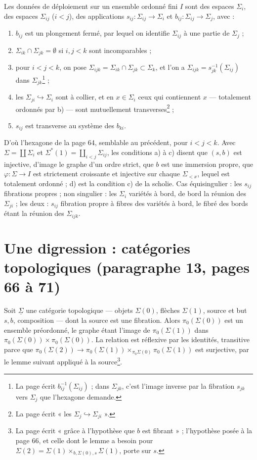 \documentclass[11pt,a4paper]{article}
\begin{document}
Les données de déploiement sur un ensemble ordonné fini $I$ sont des espaces
$\Sigma_i$, des espaces $\Sigma_{ij}$ ($i<j$), des applications $s_{ij} : \Sigma_{ij}
\to \Sigma_i$ et $b_{ij} : \Sigma_{ij} \to \Sigma_j$, avec :
\begin{enumerate}
\item[a)] $b_{ij}$ est un plongement fermé, par lequel on identifie $\Sigma_{ij}$ à
une partie de $\Sigma_j$ ;
\item[b)] $\Sigma_{ik} \cap \Sigma_{jk} = \emptyset$ si $i, j<k$ sont incomparables ;
\item[c)] pour $i<j<k$, on pose $\Sigma_{ijk} = \Sigma_{ik} \cap \Sigma_{jk} \subset
\Sigma_k$, et l'on a $\Sigma_{ijk} = s_{jk}^{-1}(\Sigma_{ij})$ dans
$\Sigma_{jk}$\footnote{La page écrit $b_{ij}^{-1}(\Sigma_{ij})$ ; dans $\Sigma_{jk}$,
c'est l'image inverse par la fibration $s_{jk}$ vers $\Sigma_j$ que l'hexagone
demande.} ;
\item[d)] les $\Sigma_{ji} \hookrightarrow \Sigma_i$ sont à collier, et en $x \in
\Sigma_i$ ceux qui contiennent $x$ — totalement ordonnés par b) — sont mutuellement
transverses\footnote{La page écrit « les $\Sigma_j \hookrightarrow \Sigma_{ji}$ ».} ;
\item[e)] $s_{ij}$ est transverse au système des $b_{ki}$.
\end{enumerate}
D'où l'hexagone de la page 64, semblable au précédent, pour $i<j<k$. Avec $\Sigma =
\coprod \Sigma_i$ et $\Sigma^{*}(1) = \coprod_{i<j} \Sigma_{ij}$, les conditions a) à c)
disent que $(s, b)$ est injective, d'image le graphe d'un ordre strict, que $b$ est
une immersion propre, que $\varphi : \Sigma \to I$ est strictement croissante et
injective sur chaque $\Sigma_{<x}$, lequel est totalement ordonné ; d) est la
condition c) de la scholie. Cas équisingulier : les $s_{ij}$ fibrations propres ; non
singulier : les $\Sigma_i$ variétés à bord, de bord la réunion des $\Sigma_{ji}$ ;
les deux : $s_{ij}$ fibration propre à fibres des variétés à bord, le fibré des bords
étant la réunion des $\Sigma_{ijk}$.

\section*{Une digression : catégories topologiques (paragraphe 13, pages 66 à 71)}

Soit $\underline{\Sigma}$ une catégorie topologique — objets $\Sigma(0)$, flèches
$\Sigma(1)$, source et but $s, b$, composition — dont la source est une fibration.
Alors $\pi_0(\Sigma(0))$ est un ensemble préordonné, le graphe étant l'image de
$\pi_0(\Sigma(1))$ dans $\pi_0(\Sigma(0)) \times \pi_0(\Sigma(0))$. La relation est
réflexive par les identités, transitive parce que $\pi_0(\Sigma(2)) \to
\pi_0(\Sigma(1)) \times_{\pi_0 \Sigma(0)} \pi_0(\Sigma(1))$ est surjective, par le
lemme suivant appliqué à la source\footnote{La page écrit « grâce à l'hypothèse
que $b$ est fibrant » ; l'hypothèse posée à la page 66, et celle dont le lemme a
besoin pour $\Sigma(2) = \Sigma(1) \times_{b, \Sigma(0), s} \Sigma(1)$, porte sur
$s$.}.
\end{document}
